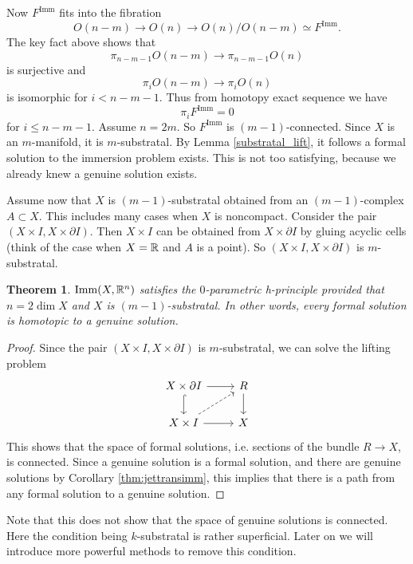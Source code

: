 \documentclass{article}
\newtheorem{theorem}{Theorem}[section]
\newtheorem{proposed work}[theorem]{Proposed Work}
\DeclareMathOperator{\Imm}{Imm}
\begin{document}
Now $F^{\Imm}$ fits into the fibration
\begin{equation*}
O(n-m)\to O(n) \to O(n)/O(n-m) \simeq F^{\Imm}.
\end{equation*}
The key fact above shows that
\begin{equation*}
\pi_{n-m-1}O(n-m)\to\pi_{n-m-1}O(n)
\end{equation*}
is surjective and
\begin{equation*}
\pi_{i}O(n-m)\to\pi_{i}O(n)
\end{equation*}
is isomorphic for $i < n-m-1$. Thus from homotopy exact sequence we have
\begin{equation*}
\pi_iF^{\Imm} = 0
\end{equation*}
for $i \le n-m-1$. Assume $n=2m$. So $F^{\Imm}$ is $(m-1)$-connected. Since $X$ is an $m$-manifold, it is $m$-substratal. By Lemma \ref{substratal_lift}, it follows a formal solution to the immersion problem exists. This is not too satisfying, because we already knew a genuine solution exists.

Assume now that $X$ is $(m-1)$-substratal obtained from an $(m-1)$-complex $A \subset X$. This includes many cases when $X$ is noncompact. Consider the pair $(X\times I, X\times \partial I)$. Then $X\times I$ can be obtained from $X\times\partial I$ by gluing acyclic cells (think of the case when $X=\mathbb R$ and $A$ is a point). So $(X\times I, X\times \partial I)$ is $m$-substratal.

\begin{theorem}
$\Imm(X,\R^n)$ satisfies the $0$-parametric h-principle provided that $n=2\dim X$ and $X$ is $(m-1)$-substratal. In other words, every formal solution is homotopic to a genuine solution.
\end{theorem}

\begin{proof}
Since the pair $(X\times I, X\times \partial I)$ is $m$-substratal, we can solve the lifting problem
\begin{equation*}
\begin{tikzcd}
X\times\partial I \arrow[r] \arrow[hookrightarrow]{d}
& R \arrow[d]
\\
X \times I \arrow[r] \arrow[dashed,ur]
& X
\end{tikzcd}
\end{equation*}
This shows that the space of formal solutions, i.e. sections of the bundle $R \to X$, is connected.  Since a genuine solution is a formal solution, and there are genuine solutions by Corollary \ref{thm:jettransimm}, this implies that there is a path from any formal solution to a genuine solution.
\end{proof}
Note that this does not show that the space of genuine solutions is connected. Here the condition being $k$-substratal is rather superficial. Later on we will introduce more powerful methods to remove this condition.
\printbibliography
\end{document}
